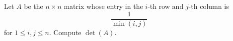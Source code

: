 Let $A$ be the $n \times n$ matrix whose entry in the $i$-th row and $j$-th column is
\[
\frac{1}{\min(i,j)}
\]
for $1 \leq i,j \leq n$. Compute $\det(A)$.
